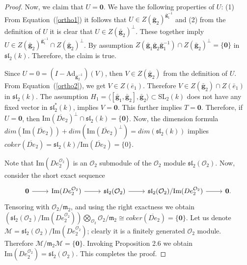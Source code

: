 \documentclass[10pt,twoside]{amsart}
\newcommand{\SL}{\mathrm{SL}}
\newcommand{\im}{\mathrm{Im}}
\newcommand{\R}{\mathcal{O}_2}
\theoremstyle{definition}
\theoremstyle{definition}
\begin{document}
\begin{proof}
Now, we claim that $U= \mathbf{0}$. We have the following properties of $U$: (1) From Equation~(\ref{ortho1}) it follows that $U\in Z(\mathbf{\bar g}_2)^{\mathbf{\bar g}_1^{-1}}$ and (2) from the definition of $U$ it is clear that $U\in Z(\mathbf{\bar g}_2)^{\perp}$. These together imply $U\in Z(\mathbf{\bar g}_2)^{\mathbf{\bar g}_1^{-1}}\cap Z(\mathbf{\bar g}_2)^{\perp} $. By assumption $Z(\mathbf{\bar g}_1\mathbf{\bar g}_2\mathbf{\bar g}_1^{-1})\cap Z(\mathbf{\bar g}_2)^{\perp}=\{\mathbf{0}\}$ in $\mathfrak{sl}_2(k)$. Therefore, the claim is true.

Since $U=0 = (I-\mathrm{Ad}_{\mathbf{\bar g}_2^{-1}})(V)$, then $V\in Z(\mathbf{\bar g}_2)$ from the definition of $U$. From Equation~(\ref{ortho2}), we get $V\in Z( \bar e_1)$. Therefore $V\in Z(\mathbf{\bar g}_2)\cap Z( \bar e_1) $ in $\mathfrak{sl}_2(k)$. The assumption $H_1 = \langle [\mathbf{\bar g}_1, \mathbf{\bar g}_2], \mathbf{\bar g}_2\rangle\subset \SL_2(k)$ does not have any fixed vector in $\mathfrak {sl}_2^*(k)$, implies $V = \mathbf{0}$. This further implies $T = \mathbf{0}$. Therefore, if $U=\mathbf{0}$, then $\im(\overline{De}_2)^\perp \cap \mathfrak{sl}_2(k) = \{\mathbf{0}\}$. Now, the dimension formula $dim(\im(\overline{De}_2)) + dim(\im(\overline{De}_2)^\perp) = dim(\mathfrak{sl}_2(k))$ implies $coker(\overline{De}_2) = \mathfrak{sl}_2(k)/ \im(\overline{De}_2) = \{0\}$. 

Note that $\im(De^{\mathcal O_2}_2)$ is an $\mathcal{O}_2$ submodule of the $\mathcal{O}_2$ module $\mathfrak{sl}_2(\mathcal{O}_2)$. Now, consider the short exact sequence 
\[\begin{tikzcd}
\mathbf{0} & {\im(De^{\R}_2)} & {\mathfrak{sl}_2(\mathcal{O}_2)} & {\mathfrak{sl}_2(\mathcal{O}_2)/\im(De^{\R}_2)} & \mathbf{0}.
	\arrow[from=1-1, to=1-2]
	\arrow[from=1-2, to=1-3]
	\arrow[from=1-3, to=1-4]
	\arrow[from=1-4, to=1-5]
\end{tikzcd}\]
Tensoring with $\mathcal{O}_2/\mathfrak{m}_2$, and using the right exactness we obtain $\left(\mathfrak{sl}_2(\mathcal{O}_2)/\im(De^{\R}_2)\right) \bigotimes_{\mathcal{O}_2}\mathcal{O}_2/\mathfrak{m}_2\cong coker(\overline{De}_2) = \{\mathbf{0}\}$. Let us denote $\mathcal{M} = \mathfrak{sl}_2(\mathcal{O}_2)/ \im(De^{\R}_2)$; clearly it is a finitely generated $\mathcal{O}_2$ module. Therefore $\mathcal{M}/ \mathfrak{m}_2\mathcal{M} = \{\mathbf{0}\}$. Invoking Proposition 2.6 \cite{Atiyahmacdonald} we obtain $\im(De^{\R}_2) = \mathfrak{sl}_2(\mathcal{O}_2)$. This completes the proof.
\end{proof}
\end{document}
